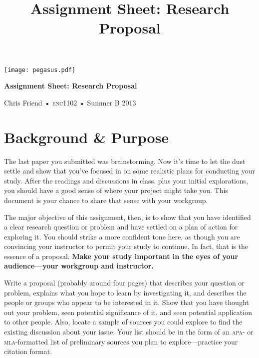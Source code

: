\documentclass[12pt, oneside]{amsart}	%
\title[Research Proposal]{Assignment Sheet: Research Proposal}
\begin{document}
%
\thispagestyle{empty}

\vspace{-2in}
\begin{center}
\huge
\texttt{[image: pegasus.pdf]}

\textbf{Assignment Sheet: Research Proposal}

{\normalsize Chris Friend • \textsc{enc1102} • Summer B 2013}
\end{center}
\vspace{1.5\baselineskip}

\section{Background \& Purpose} %
\label{sec:background}
The last paper you submitted was brainstorming. Now it's time to let the dust settle and show that you've focused in on some realistic plans for conducting your study. After the readings and discussions in class, plus your initial explorations, you should have a good sense of where your project might take you. This document is your chance to share that sense with your workgroup.

The major objective of this assignment, then, is to show that you have identified a clear research question or problem and have settled on a plan of action for exploring it. You should strike a more confident tone here, as though you are convincing your instructor to permit your study to continue. In fact, that is the essence of a proposal. \textbf{Make your study important in the eyes of your audience—your workgroup and instructor.}

Write a proposal (probably around four pages) that describes your question or problem, explains what you hope to learn by investigating it, and describes the people or groups who appear to be interested in it. Show that you have thought out your problem, seen potential significance of it, and seen potential application to other people. Also, locate a sample of sources you could explore to find the existing discussion about your issue. Your list should be in the form of an \textsc{apa}- or \textsc{mla}-formatted list of preliminary sources you plan to explore---practice your citation format.
\end{document}
